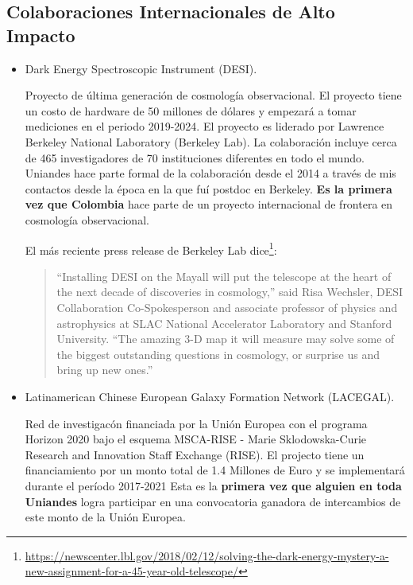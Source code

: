 \documentclass{article}
\begin{document}
\subsection{Colaboraciones Internacionales de Alto Impacto}

\begin{itemize}

\item Dark Energy Spectroscopic Instrument (DESI).

Proyecto de \'ultima generaci\'on de cosmolog\'ia observacional.
El proyecto tiene un costo de hardware de 50 millones de d\'olares y
empezar\'a a tomar mediciones en el periodo 2019-2024.
El proyecto es liderado por Lawrence Berkeley National Laboratory
(Berkeley Lab). 
La colaboraci\'on incluye cerca de 465 investigadores de 70
instituciones diferentes en todo el mundo.
Uniandes hace parte formal de la colaboraci\'on desde el 2014 a
trav\'es de mis contactos desde la \'epoca en la que fu\'i postdoc en
Berkeley. 
{\bf Es la primera vez que Colombia} hace parte de un proyecto internacional
de frontera en cosmolog\'ia observacional.


El m\'as reciente press release de Berkeley Lab
dice\footnote{\url{https://newscenter.lbl.gov/2018/02/12/solving-the-dark-energy-mystery-a-new-assignment-for-a-45-year-old-telescope/}}: 
\begin{quote}
“Installing DESI on the Mayall will put the telescope at the heart of
  the next decade of discoveries in cosmology,” said Risa Wechsler,
  DESI Collaboration Co-Spokesperson and associate professor of
  physics and astrophysics at SLAC National Accelerator Laboratory and
  Stanford University. “The amazing 3-D map it will measure may solve
  some of the biggest outstanding questions in cosmology, or surprise
  us and bring up new ones.” 
\end{quote}


\item Latinamerican Chinese European Galaxy Formation Network
  (LACEGAL). 

Red de investigac\'on financiada por la Uni\'on Europea con el
programa Horizon 2020 bajo el esquema MSCA-RISE - Marie
Sklodowska-Curie Research and Innovation Staff Exchange (RISE). El
projecto tiene un financiamiento por un monto total de 1.4 Millones de
Euro y se implementar\'a durante el per\'iodo 2017-2021 
Esta es la {\bf primera vez que alguien en toda Uniandes} logra
participar en una convocatoria ganadora de intercambios de este monto
de la Uni\'on Europea.


\end{itemize}
\end{document}
